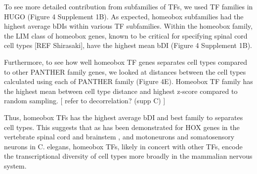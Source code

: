 To see more detailed contribution from subfamilies of TFs, we used TF families in HUGO (Figure 4 Supplement 1B). As expected, homeobox subfamilies had the highest average bDIs within various TF subfamilies. Within the homeobox family, the LIM class of homeobox genes, known to be critical for specifying spinal cord cell types [REF Shirasaki], have the highest mean bDI (Figure 4 Supplement 1B). 

Furthermore, to see how well homeobox TF genes separates cell types compared to other PANTHER family genes, we looked at distances between the cell types calculated using each of PANTHER family (Figure 4E). Homeobox TF family has the highest mean between cell type distance and highest z-score compared to random sampling. [ refer to decorrelation? (supp C) ]

Thus, homeobox TFs has the highest average bDI and best family to separates cell types. This suggests that as has been demonstrated for HOX genes in the vertebrate spinal cord and brainstem \cite{Dasen_2009,Philippidou_2013}, and motoneurons \cite{Kratsios_2017} and somatosensory neurons \cite{Zheng_2015} in C. elegans, homeobox TFs, likely in concert with other TFs, encode the transcriptional diversity of cell types more broadly in the mammalian nervous system.
